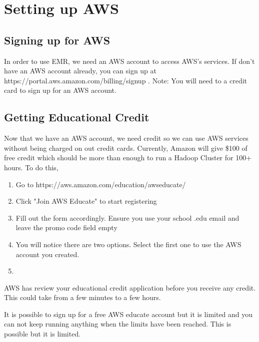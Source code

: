 \documentclass{article}
\begin{document}
\section{Setting up AWS}
\subsection{Signing up for AWS}
In order to use EMR, we need an AWS account to access AWS's services. If don't have an AWS account already,  you can sign up at https://portal.aws.amazon.com/billing/signup . Note: You will need to a credit card to sign up for an AWS account. 
\subsection{Getting Educational Credit}
Now that we have an AWS account, we need credit so we can use AWS services without being charged on out credit cards. Currently, Amazon will give \$100 of free credit which should be more than enough to run a Hadoop Cluster for 100+ hours. To do this, 
\begin{enumerate}
    \item Go to https://aws.amazon.com/education/awseducate/
    \item Click "Join AWS Educate" to start registering
    \item Fill out the form accordingly. Ensure you use your school .edu email and leave the promo code field empty
    \item You will notice there are two options. Select the first one to use the AWS account you created.
    \item  
\end{enumerate}

\begin{info}
AWS has review your educational credit application before you receive any credit. This could take from a few minutes to a few hours. 
\end{info}

\begin{info}
It is possible to sign up for a free AWS educate account but it is limited and you can not keep running anything when the limits have been reached. This is possible but it is limited.
\end{info}

\end{document}

